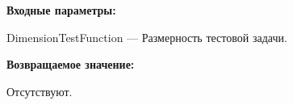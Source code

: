 \textbf{Входные параметры:}

DimensionTestFunction --- Размерность тестовой задачи.

\textbf{Возвращаемое значение:}

Отсутствуют.